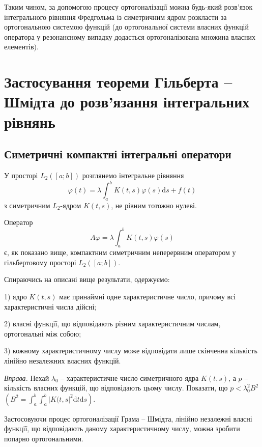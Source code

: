 \documentclass[14pt,twoside]{extreport}
\theoremstyle{mystyle}
\numberwithin{equation}{chapter}
\begin{document}
Таким чином, за допомогою процесу ортогоналізації можна будь-який розв'язок інтегрального рівняння Фредгольма із симетричним ядром розкласти за ортогональною системою функцій (до ортогональної системи власних функцій оператора у резонансному випадку додасться ортогоналізована множина власних елементів).

\chapter{Застосування теореми Гільберта -- Шмідта до розв'язання інтегральних рівнянь}

\section{Симетричні компактні інтегральні оператори}

У просторі $L_2([a; b])$ розглянемо інтегральне рівняння
\begin{equation}\label{fredhs}
 \varphi(t) = \lambda \int_{a}^{b} K(t, s) \varphi(s) \mathrm{d}s + f(t)
\end{equation}
з симетричним $L_2$-ядром $K(t, s)$, не рівним тотожно нулеві.

Оператор
\[
 A\varphi = \lambda \int_{a}^{b} K(t, s) \varphi(s)
\]
є, як показано вище, компактним симетричним неперервним оператором у гільбертовому просторі $L_2([a; b])$.

Спираючись на описані вище результати, одержуємо:

1) ядро $K(t, s)$ має принаймні одне характеристичне число, причому всі характеристичні числа дійсні;

2) власні функції, що відповідають різним характеристичним числам, ортогональні між собою;

3) кожному характеристичному числу може відповідати лише скінченна кількість лінійно незалежних власних функцій.

\begin{small}
\emph{Вправа.} Нехай $\lambda_0$ -- характеристичне число симетричного ядра $K(t, s)$, а $p$ -- кількість власних функцій, що відповідають цьому числу. Показати, що $p < \lambda_0^2B^2$ $\left(B^2=\int_{a}^{b} \int_{a}^{b} |K(t, s|^2 \mathrm{d}t \mathrm{d}s\right)$.
\end{small}

Застосовуючи процес ортогоналізації Грама -- Шмідта, лінійно незалежні власні функції, що відповідають даному характеристичному числу, можна зробити попарно ортогональними.
\end{document}
